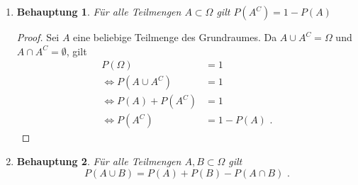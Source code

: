 \documentclass[a4paper]{scrartcl}
\newtheorem*{behaupt}{Behauptung}
\newcommand{\gdw}{\Leftrightarrow}
\begin{document}
\begin{enumerate}[label=\bfseries\arabic*.]
\begin{enumerate}[label=(\roman*)]
\begin{proof}[Beweis durch vollständige Induktion]
                    
                \end{proof}

            \item
                \begin{behaupt}
                    Für alle Teilmengen $A \subset \Omega$ gilt
                    $P(A^C) = 1 - P(A)$
                \end{behaupt}
                \begin{proof}
                    Sei $A$ eine beliebige Teilmenge des Grundraumes.
                    Da $A \cup A^C = \Omega$ und $A \cap A^C = \emptyset$, gilt
                    \begin{equation}
                        \begin{split}
                            P(\Omega) &= 1 \\
                            \gdw P(A \cup A^C) &= 1 \\
                            \gdw P(A) + P(A^C) &= 1 \\
                            \gdw P(A^C) &= 1 - P(A) \text{ .}
                        \end{split}
                    \end{equation}
                \end{proof}

            \setcounter{enumii}{4}
            \item
                \begin{behaupt}
                    Für alle Teilmengen $A, B \subset \Omega$ gilt
                    \begin{equation}
                        P(A \cup B) = P(A) + P(B) - P(A \cap B) \text{ .}
                    \end{equation}                    


\end{behaupt}
\end{enumerate}
\end{enumerate}
\end{document}
